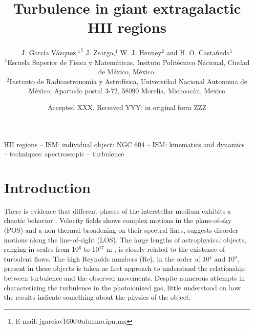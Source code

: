 \documentclass[fleqn,usenatbib]{mnras}
\title[Turbulence in GEHRs]{Turbulence in giant extragalactic HII regions}
\author[J. García-Vázquez et al.]{
J. García Vázquez,$^{1}$\thanks{E-mail: jgarciav1600@alumno.ipn.mx}
J. Zsargo,$^{1}$
W. J. Henney$^{2}$
and H. O. Castañeda$^{1}$
\\
$^{1}$Escuela Superior de Física y Matemáticas, Insituto Politécnico Nacional, Ciudad de México, México.\\
$^{2}$Instunto de Radioastronomía y Astrofísica, Universidad Nacional Autonoma de México, Apartado postal 3-72, 58090 Morelia, Michoacán, Mexico\\
}
\date{Accepted XXX. Received YYY; in original form ZZZ}
\newcommand\halpha{H${\alpha}$}
\newcommand\n{[\ion{N}{II}]$\lambda$6584}
\newcommand\oi{[\ion{O}{III}]$\lambda$5007}
\newcommand\s{[\ion{S}{II}]$\lambda$6737}
\begin{document}
\label{firstpage}
\pagerange{\pageref{firstpage}--\pageref{lastpage}}
\maketitle

\begin{abstract}


\end{abstract}

\begin{keywords}
HII regions -- ISM: individual object: NGC 604 -- ISM: kinematics and dynamics -- techniques: spectroscopic -- turbulence
\end{keywords}



\section{Introduction}

There is evidence that different phases of the interstellar medium exhibits a chaotic behavior \citep{franco1999interstellar,elmegreen2004interstellar,scalo2004interstellar}. Velocity fields shows complex motions in the plane-of-sky (POS) and a non-thermal broadening on their spectral lines, suggests disorder motions along the line-of-sight (LOS). The large lengths of astrophysical objects, ranging in scales from 10$^{6}$ to 10$^{17}$ m \citep{chepurnov2010extending}, is closely related to the existence of turbulent flows. The high Reynolds numbers (Re), in the order of 10$^{4}$ and 10$^{9}$, present in these objects \citep{lagrois2011} is taken as first approach to understand the relationship between turbulence and the observed movements. Despite numerous attempts in characterizing the turbulence in the photoionized gas, little understood on how the results indicate something about the physics of the object.   
\end{document}
